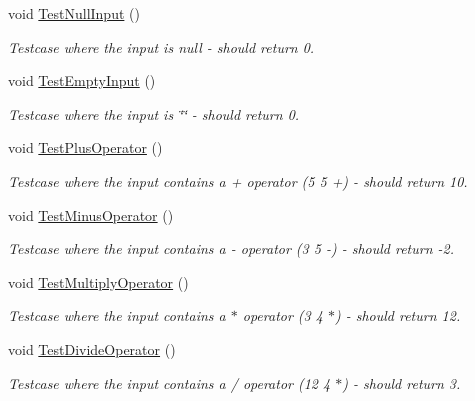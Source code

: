 \begin{DoxyCompactItemize}
\item 
void \hyperlink{class_reverse_polish_calculator_1_1_reverse_polish_calculator_tests_a236d73dc474a28991f21833ad3de7c2d}{Test\+Null\+Input} ()
\begin{DoxyCompactList}\small\item\em Testcase where the input is null -\/ should return 0. \end{DoxyCompactList}\item 
void \hyperlink{class_reverse_polish_calculator_1_1_reverse_polish_calculator_tests_af42a2b3ffcc69e2aec725c638b48aea5}{Test\+Empty\+Input} ()
\begin{DoxyCompactList}\small\item\em Testcase where the input is \char`\"{}\char`\"{} -\/ should return 0. \end{DoxyCompactList}\item 
void \hyperlink{class_reverse_polish_calculator_1_1_reverse_polish_calculator_tests_a1f916d3f516de2374501a0a972f4063b}{Test\+Plus\+Operator} ()
\begin{DoxyCompactList}\small\item\em Testcase where the input contains a + operator (5 5 +) -\/ should return 10. \end{DoxyCompactList}\item 
void \hyperlink{class_reverse_polish_calculator_1_1_reverse_polish_calculator_tests_a8e8f0f8f7174acc0cc2ffb389c02b33a}{Test\+Minus\+Operator} ()
\begin{DoxyCompactList}\small\item\em Testcase where the input contains a -\/ operator (3 5 -\/) -\/ should return -\/2. \end{DoxyCompactList}\item 
void \hyperlink{class_reverse_polish_calculator_1_1_reverse_polish_calculator_tests_aebb0f2edadb7f5327d158ec681e0bcd8}{Test\+Multiply\+Operator} ()
\begin{DoxyCompactList}\small\item\em Testcase where the input contains a $\ast$ operator (3 4 $\ast$) -\/ should return 12. \end{DoxyCompactList}\item 
void \hyperlink{class_reverse_polish_calculator_1_1_reverse_polish_calculator_tests_a9311abc2b10d8b1c4bb52647ee147b22}{Test\+Divide\+Operator} ()
\begin{DoxyCompactList}\small\item\em Testcase where the input contains a / operator (12 4 $\ast$) -\/ should return 3. \end{DoxyCompactList}\item 

\end{DoxyCompactItemize}
